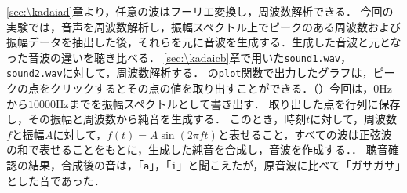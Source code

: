 \ref{sec:\kadaiad}章より，任意の波はフーリエ変換し，周波数解析できる．
今回の実験では，音声を周波数解析し，振幅スペクトル上でピークのある周波数および振幅データを抽出した後，それらを元に音波を生成する．生成した音波と元となった音波の違いを聴き比べる．
\method
\ref{sec:\kadaicb}章で用いた\texttt{sound1.wav}，\texttt{sound2.wav}に対して，周波数解析する．
\matlab の\texttt{plot}関数で出力したグラフは，ピークの点をクリックするとその点の値を取り出すことができる．（）今回は，\(0\textrm{Hz}\)から\(10000\textrm{Hz}\)までを振幅スペクトルとして書き出す．
取り出した点を行列に保存し，その振幅と周波数から純音を生成する．
このとき，時刻\(t\)に対して，周波数\(f\)と振幅\(A\)に対して，\(f(t) = A\sin(2\pi ft)\)と表せること，すべての波は正弦波の和で表せることをもとに，生成した純音を合成し，音波を作成する．\scall{}．
\result
聴音確認の結果，合成後の音は，「\texttt{a}」，「\texttt{i}」と聞こえたが，原音波に比べて「ガサガサ」とした音であった．
